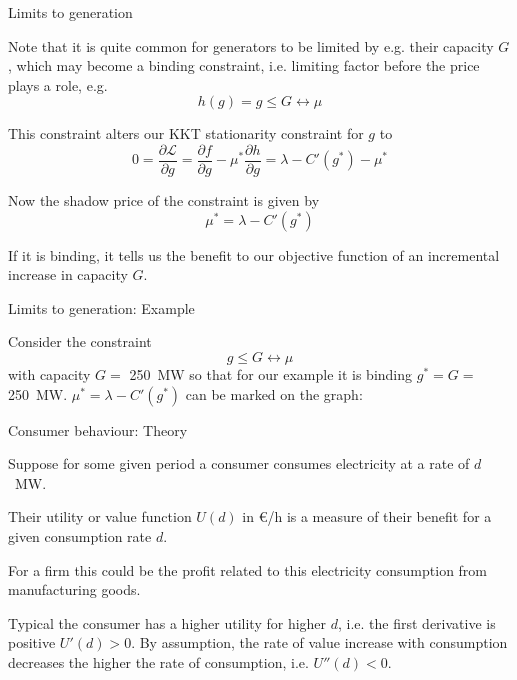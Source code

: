 \documentclass[10pt,aspectratio=169,dvipsnames]{beamer}
\def\l{\lambda}
\def\m{\mu}
\def\d{\partial}
\def\cL{\mathcal{L}}
\begin{document}
\begin{frame}{Limits to generation}


  Note that it is quite common for generators to be limited by
  e.g. their capacity $G$, which may become a \alert{binding constraint}, i.e. limiting factor before the price plays a role, e.g.
  \begin{equation*}
    h(g) = g \leq G  \leftrightarrow \m
  \end{equation*}

  This constraint alters our KKT stationarity constraint for $g$ to
    \begin{equation*}
    0 = \frac{\d \cL}{\d g} =  \frac{\d f}{\d g} - \m^* \frac{\d h}{\d g} =  \l  -  C'(g^*) - \m^*
  \end{equation*}

    Now the \alert{shadow price} of the constraint is given by
    \begin{equation*}
      \m^* = \l - C'(g^*)
    \end{equation*}

    If it is binding, it tells us the benefit to our objective function of an incremental increase in capacity $G$.

\end{frame}



\begin{frame}{Limits to generation: Example}

  Consider the constraint
  \begin{equation*}
    g \leq G  \leftrightarrow \m
  \end{equation*}
  with capacity $G = $ 250~MW so that for our example it is binding
  $g^* = G = $ 250~MW. $\m^* = \l - C'(g^*)$ can be marked on the
  graph:

  \centering



\end{frame}




\begin{frame}{Consumer behaviour: Theory}

  Suppose for some given period a consumer consumes electricity at a rate of
  $d$~MW.


  Their \alert{utility or value function} $U(d)$ in \euro/h is a
  measure of their benefit for a given consumption rate $d$.

  For a firm this could be the profit related to this electricity
  consumption from manufacturing goods.


  Typical the consumer has a higher utility for higher $d$, i.e. the
  first derivative is positive $U'(d) > 0$. By assumption, the rate of
  value increase with consumption decreases the higher the rate of
  consumption, i.e. $U''(d) < 0$.

\end{frame}
\end{document}
